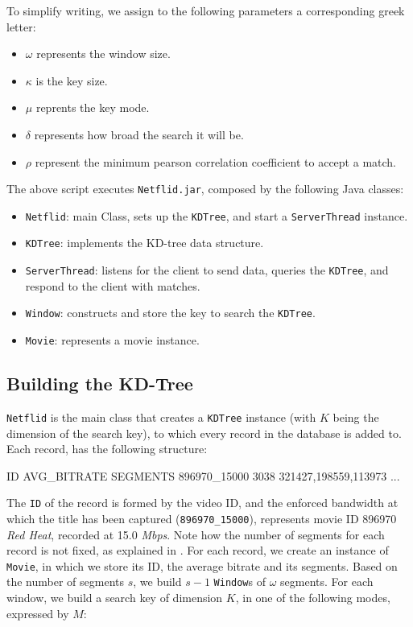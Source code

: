 To simplify writing, we assign to the following parameters a corresponding greek letter:

\begin{itemize}
    \item $\omega$ represents the window size.
    \item $\kappa$ is the key size. 
    \item $\mu$ reprents the key mode.
    \item $\delta$ represents how broad the search it will be.
    \item $\rho$ represent the minimum pearson correlation coefficient to accept a match.
\end{itemize}

The above script executes \texttt{Netflid.jar}, composed by the following
Java classes:

\begin{itemize}
    \item \texttt{Netflid}: main Class, sets up the \texttt{KDTree}, and start a
        \texttt{ServerThread} instance.
    \item \texttt{KDTree}: implements the KD-tree data structure.
    \item \texttt{ServerThread}: listens for the client to send data, queries
        the \texttt{KDTree}, and respond to the client with matches.
    \item \texttt{Window}: constructs and store the key to search the \texttt{KDTree}.
    \item \texttt{Movie}: represents a movie instance.

\end{itemize}

\subsection{Building the KD-Tree}

\texttt{Netflid} is the main class that creates a \texttt{KDTree} instance
(with $K$ being the dimension of the search key), to which every record in the
database is added to. Each record, has the following structure:

\begin{bash_script} 
ID              AVG_BITRATE  SEGMENTS
896970_15000    3038         321427,198559,113973 ...
\end{bash_script}

The \texttt{ID} of the record is formed by the video ID, and the
enforced bandwidth at which the title has been captured
(\texttt{896970\_15000}), represents movie ID 896970 \emph {Red Heat},
recorded at 15.0 \emph{Mbps}. Note how the number of segments for each
record is not fixed, as explained in .  For each
record, we create an instance of \texttt{Movie}, in which we store its
ID, the average bitrate and its segments. Based on the number of
segments $s$, we build $s-1$ \texttt{Window}s of $\omega$ segments.
For each window, we build a search key of dimension $K$, in one of the
following modes, expressed by $M$: 

